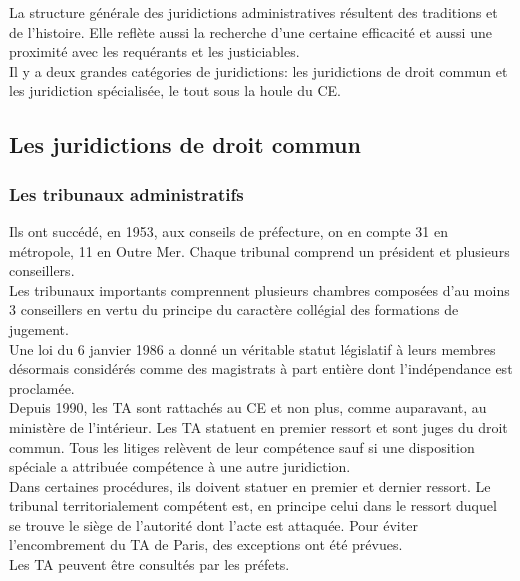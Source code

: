 \documentclass[12pt, a4paper, openany]{book}
\begin{document}
La structure générale des juridictions administratives résultent des traditions et de l'histoire. Elle reflète aussi la recherche d'une certaine efficacité et aussi une proximité avec les requérants et les justiciables.  \\
Il y a deux grandes catégories de juridictions: les juridictions de droit commun et les juridiction spécialisée, le tout sous la houle du CE.

\subsection{Les juridictions de droit commun}

\subsubsection{Les tribunaux administratifs}

Ils ont succédé, en 1953, aux conseils de préfecture, on en compte 31 en métropole, 11 en Outre Mer. Chaque tribunal comprend un président et plusieurs conseillers. \\
Les tribunaux importants comprennent plusieurs chambres composées d'au moins 3 conseillers en vertu du principe du caractère collégial des formations de jugement. \\
Une loi du 6 janvier 1986 a donné un véritable statut législatif à leurs membres désormais considérés comme des magistrats à part entière dont l'indépendance est proclamée. \\
Depuis 1990, les TA sont rattachés au CE et non plus, comme auparavant, au ministère de l'intérieur. Les TA statuent en premier ressort et sont juges du droit commun. Tous les litiges relèvent de leur compétence sauf si une disposition spéciale a attribuée compétence à une autre juridiction. \\
Dans certaines procédures, ils doivent statuer en premier et dernier ressort. Le tribunal territorialement compétent est, en principe celui dans le ressort duquel se trouve le siège de l'autorité dont l'acte est attaquée. Pour éviter l'encombrement du TA de Paris, des exceptions ont été prévues. \\
Les TA peuvent être consultés par les préfets. 



\section{}
\end{document}
